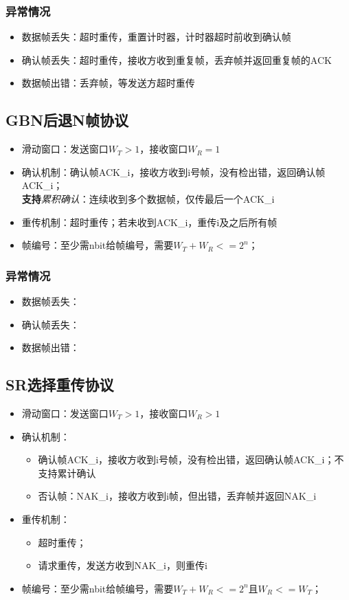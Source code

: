 \subsubsection{异常情况}
\begin{itemize}
    \item 数据帧丢失：超时重传，重置计时器，计时器超时前收到确认帧
    \item 确认帧丢失：超时重传，接收方收到重复帧，丢弃帧并返回重复帧的ACK
    \item 数据帧出错：丢弃帧，等发送方超时重传
\end{itemize}


\subsection{GBN后退N帧协议}
\begin{itemize}
    \item 滑动窗口：发送窗口\(W_T > 1\)，接收窗口\(W_R = 1\)
    \item 确认机制：确认帧ACK\_i，接收方收到i号帧，没有检出错，返回确认帧ACK\_i； \\
    \textbf{支持}\textit{累积确认}：连续收到多个数据帧，仅传最后一个ACK\_i
    \item 重传机制：超时重传；若未收到ACK\_i，重传i及之后所有帧
    \item 帧编号：至少需nbit给帧编号，需要\(W_T + W_R <= 2^n\)；
\end{itemize}

\subsubsection{异常情况}
\begin{itemize}
    \item 数据帧丢失：
    \item 确认帧丢失：
    \item 数据帧出错：
\end{itemize}


\subsection{SR选择重传协议}
\begin{itemize}
    \item 滑动窗口：发送窗口\(W_T > 1\)，接收窗口\(W_R > 1\)
    \item 确认机制：\begin{itemize}
        \item 确认帧ACK\_i，接收方收到i号帧，没有检出错，返回确认帧ACK\_i；不支持累计确认
        \item 否认帧：NAK\_i，接收方收到i帧，但出错，丢弃帧并返回NAK\_i
    \end{itemize}
    \item 重传机制：\begin{itemize}
        \item 超时重传；
        \item 请求重传，发送方收到NAK\_i，则重传i
    \end{itemize}
    \item 帧编号：至少需nbit给帧编号，需要\(W_T + W_R <= 2^n\)且\(W_R <= W_T\)；
\end{itemize}

